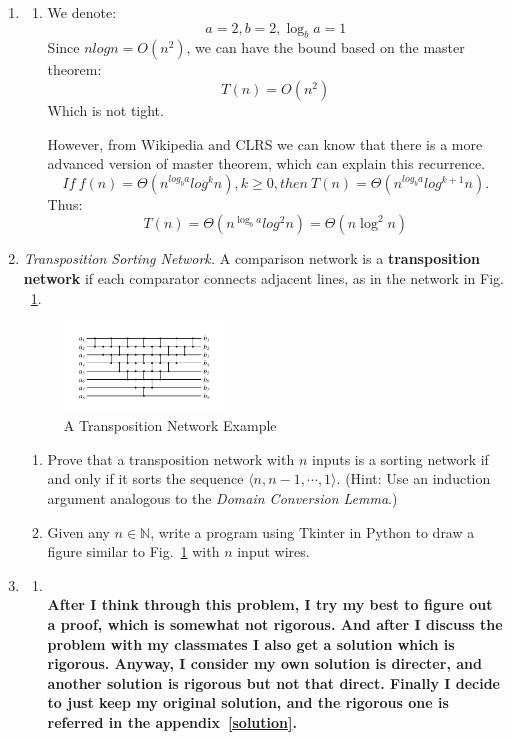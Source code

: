 \documentclass[12pt,a4paper]{article}
\makeatletter
\newtheorem*{solution}{Solution}
\theoremstyle{definition}
\renewenvironment{solution}[1][Solution] {\par\pushQED{\qed}\normalfont\topsep6\p@\@plus6\p@\relax\trivlist\item[\hskip\labelsep\bfseries#1\@addpunct{.}]\ignorespaces}{\popQED\endtrivlist\@endpefalse} \makeatother
\makeatother
\begin{document}
\begin{enumerate}
\begin{solution}
\begin{enumerate}
\item
We denote:
$$
a=2,b=2,\log_ba=1
$$
Since $nlogn=O(n^2)$, we can have the bound based on the master theorem:
$$
T(n)=O(n^2)
$$
Which is not tight.

However, from Wikipedia and CLRS we can know that there is a more advanced version of master theorem, which can explain this recurrence.
$$
If\ f(n)=\Theta(n^{log_ba}log^kn),k\geq 0, then\ T(n)=\Theta(n^{log_ba}log^{k+1}n).
$$
Thus:
$$
T(n)=\Theta(n^{\log_ba}log^2n)=\Theta(n\log^2n)
$$


\end{enumerate}
\end{solution}
\item
\textit{Transposition Sorting Network.} A comparison network is a \textbf{transposition network}  if each comparator connects adjacent lines, as in the network in Fig. ~\ref{Fig-Transposition}.

\begin{figure}[htbp]
    \centering
    \includegraphics[width=0.4\textwidth]{Fig-Transposition.pdf}
    \caption{A Transposition Network Example}\label{Fig-Transposition}
\end{figure}

\begin{enumerate}
\item Prove that a transposition network with $n$ inputs is a sorting network if and only if it sorts the sequence $\langle n, n-1, \cdots, 1 \rangle$. {\color{blue}(Hint: Use an induction argument analogous to the \emph{Domain Conversion Lemma}.)}
\item {\color{red}{(Optional Sub-question with Bonus)}} Given any $n \in \mathbb{N}$, write a program using Tkinter in Python to draw a figure similar to Fig.~\ref{Fig-Transposition} with $n$ input wires.
\end{enumerate}


\begin{solution}
\begin{enumerate} 
\item
~\\
\textbf{After I think through this problem, I try my best to figure out a proof, which is somewhat not rigorous. And after I discuss the problem with my classmates I also get a solution which is rigorous. Anyway, I consider my own solution is directer, and another solution is rigorous but not that direct. Finally I decide to just keep my original solution, and the rigorous one is referred in the appendix~\ref{solution}.}


\end{enumerate}
\end{solution}
\end{enumerate}
\end{document}
